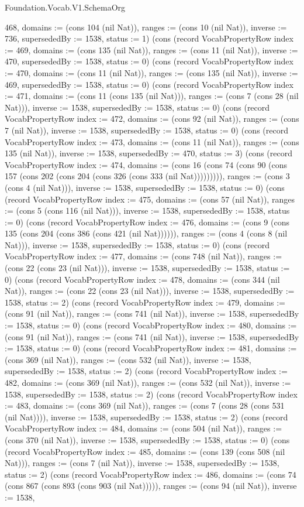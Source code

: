 \begin{lexlean}{Foundation.Vocab.V1.SchemaOrg}
\begin{semanticmodule}
{468, domains := (cons 104 (nil Nat)), ranges := (cons 10 (nil Nat)), inverse := 736, supersededBy := 1538, status := 1}) (cons (record VocabPropertyRow {index := 469, domains := (cons 135 (nil Nat)), ranges := (cons 11 (nil Nat)), inverse := 470, supersededBy := 1538, status := 0}) (cons (record VocabPropertyRow {index := 470, domains := (cons 11 (nil Nat)), ranges := (cons 135 (nil Nat)), inverse := 469, supersededBy := 1538, status := 0}) (cons (record VocabPropertyRow {index := 471, domains := (cons 11 (cons 135 (nil Nat))), ranges := (cons 7 (cons 28 (nil Nat))), inverse := 1538, supersededBy := 1538, status := 0}) (cons (record VocabPropertyRow {index := 472, domains := (cons 92 (nil Nat)), ranges := (cons 7 (nil Nat)), inverse := 1538, supersededBy := 1538, status := 0}) (cons (record VocabPropertyRow {index := 473, domains := (cons 11 (nil Nat)), ranges := (cons 135 (nil Nat)), inverse := 1538, supersededBy := 470, status := 3}) (cons (record VocabPropertyRow {index := 474, domains := (cons 16 (cons 74 (cons 90 (cons 157 (cons 202 (cons 204 (cons 326 (cons 333 (nil Nat))))))))), ranges := (cons 3 (cons 4 (nil Nat))), inverse := 1538, supersededBy := 1538, status := 0}) (cons (record VocabPropertyRow {index := 475, domains := (cons 57 (nil Nat)), ranges := (cons 5 (cons 116 (nil Nat))), inverse := 1538, supersededBy := 1538, status := 0}) (cons (record VocabPropertyRow {index := 476, domains := (cons 9 (cons 135 (cons 204 (cons 386 (cons 421 (nil Nat)))))), ranges := (cons 4 (cons 8 (nil Nat))), inverse := 1538, supersededBy := 1538, status := 0}) (cons (record VocabPropertyRow {index := 477, domains := (cons 748 (nil Nat)), ranges := (cons 22 (cons 23 (nil Nat))), inverse := 1538, supersededBy := 1538, status := 0}) (cons (record VocabPropertyRow {index := 478, domains := (cons 344 (nil Nat)), ranges := (cons 22 (cons 23 (nil Nat))), inverse := 1538, supersededBy := 1538, status := 2}) (cons (record VocabPropertyRow {index := 479, domains := (cons 91 (nil Nat)), ranges := (cons 741 (nil Nat)), inverse := 1538, supersededBy := 1538, status := 0}) (cons (record VocabPropertyRow {index := 480, domains := (cons 91 (nil Nat)), ranges := (cons 741 (nil Nat)), inverse := 1538, supersededBy := 1538, status := 0}) (cons (record VocabPropertyRow {index := 481, domains := (cons 369 (nil Nat)), ranges := (cons 532 (nil Nat)), inverse := 1538, supersededBy := 1538, status := 2}) (cons (record VocabPropertyRow {index := 482, domains := (cons 369 (nil Nat)), ranges := (cons 532 (nil Nat)), inverse := 1538, supersededBy := 1538, status := 2}) (cons (record VocabPropertyRow {index := 483, domains := (cons 369 (nil Nat)), ranges := (cons 7 (cons 28 (cons 531 (nil Nat)))), inverse := 1538, supersededBy := 1538, status := 2}) (cons (record VocabPropertyRow {index := 484, domains := (cons 504 (nil Nat)), ranges := (cons 370 (nil Nat)), inverse := 1538, supersededBy := 1538, status := 0}) (cons (record VocabPropertyRow {index := 485, domains := (cons 139 (cons 508 (nil Nat))), ranges := (cons 7 (nil Nat)), inverse := 1538, supersededBy := 1538, status := 2}) (cons (record VocabPropertyRow {index := 486, domains := (cons 74 (cons 867 (cons 893 (cons 903 (nil Nat))))), ranges := (cons 94 (nil Nat)), inverse := 1538, }
\end{semanticmodule}
\end{lexlean}
